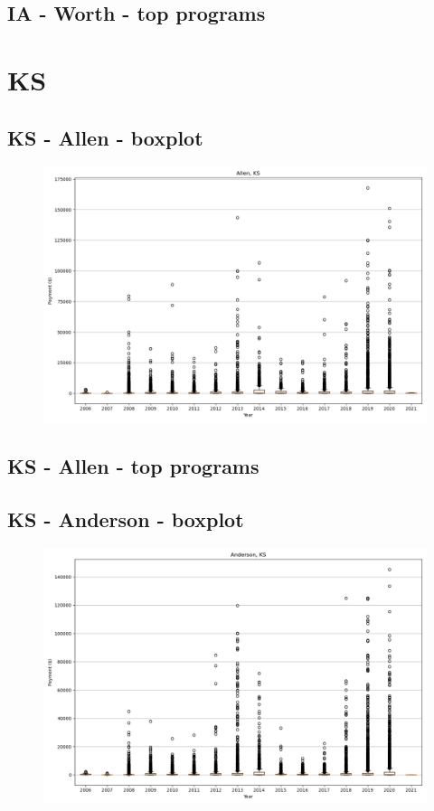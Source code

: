 \subsection*{IA - Worth - top programs}

\newpage
\section*{KS}
\subsection*{KS - Allen - boxplot}
\begin{figure}[h]
\centering
\includegraphics[width=7in]{../output/boxplots/counties/Allen-KS_boxplot.png}
\end{figure}


\subsection*{KS - Allen - top programs}

\newpage
\subsection*{KS - Anderson - boxplot}
\begin{figure}[h]
\centering
\includegraphics[width=7in]{../output/boxplots/counties/Anderson-KS_boxplot.png}
\end{figure}


